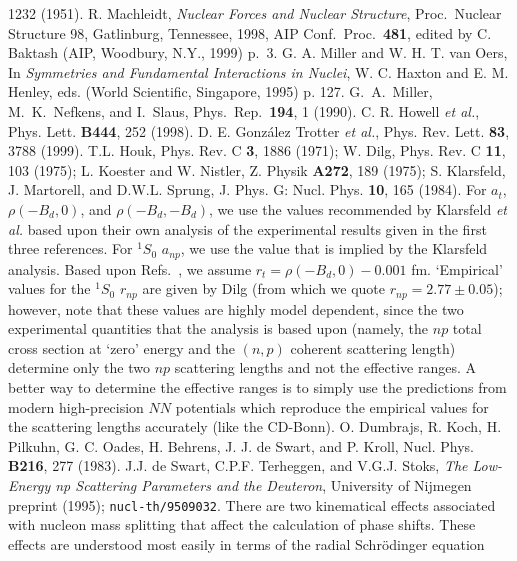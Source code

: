 \begin{references}
1232 (1951).
 R. Machleidt, {\it Nuclear Forces and Nuclear Structure},
Proc.\ Nuclear Structure 98, Gatlinburg, Tennessee, 1998, AIP Conf.\
Proc.\ {\bf 481}, edited by C. Baktash (AIP, Woodbury, N.Y., 1999) p.~3.
\bibitem{MO95} G. A. Miller and W. H. T. van Oers, In {\it Symmetries
and Fundamental Interactions in Nuclei},
W. C. Haxton and E. M. Henley, eds. (World Scientific, Singapore, 1995)
p. 127.
 G.\ A.\ Miller, M.\ K.\ Nefkens, and I.\ Slaus, Phys.\ Rep.\
{\bf 194}, 1 (1990). 
\bibitem{How98} C. R. Howell {\it et al.}, Phys. Lett. {\bf B444}, 252 (1998).
\bibitem{Gon99} D. E. Gonz\'alez Trotter {\it et al.}, 
Phys. Rev. Lett. {\bf 83}, 3788 (1999).
\bibitem{KMS84} T.L. Houk, Phys. Rev. C {\bf 3}, 1886 (1971);
         W. Dilg, Phys. Rev. C {\bf 11}, 103 (1975);
         L. Koester and W. Nistler, Z. Physik {\bf A272}, 189 (1975); 
         S. Klarsfeld, J. Martorell, and D.W.L. Sprung,
         J. Phys. G: Nucl. Phys. {\bf 10}, 165 (1984).
For $a_t$, $\rho(-B_d,0)$, and $\rho(-B_d,-B_d)$,
we use the values recommended by Klarsfeld {\it et al.} based upon
their own analysis of the experimental results given in
the first three references.    
For $^1S_0$ $a_{np}$, we use the value that is implied by
the Klarsfeld analysis. Based upon Refs.~\cite{Dum83,STS95}, we assume
$r_t = \rho(-B_d,0)-0.001$ fm.
`Empirical' values for the $^1S_0$ $r_{np}$ are given by Dilg
(from which we quote $r_{np} = 2.77\pm 0.05$);
however, note that these values are highly model dependent,
since the two experimental quantities that the analysis is based upon
(namely, the $np$ total cross section at `zero' energy and
the $(n,p)$ coherent scattering length) determine only the two $np$
scattering lengths and not the effective ranges.
A better way to determine the effective ranges is to simply
use the predictions from modern high-precision $NN$ potentials
which reproduce the empirical values for the scattering lengths
accurately (like the CD-Bonn).
\bibitem{Dum83} O. Dumbrajs, R. Koch, H. Pilkuhn, G. C. Oades,
H. Behrens, J. J. de Swart, and P. Kroll,
Nucl. Phys. {\bf B216}, 277 (1983).
\bibitem{STS95} J.J. de Swart, C.P.F. Terheggen, and V.G.J. Stoks,
         {\it The Low-Energy np Scattering Parameters and the Deuteron},
         University of Nijmegen preprint (1995); 
         {\tt nucl-th/9509032}. 
\bibitem{foot1} 
There are two kinematical effects associated with nucleon
mass splitting that affect the calculation of phase shifts.
These effects are understood most
easily in terms of the radial Schr\"odinger equation 
\begin{displaymath}

\end{displaymath}
\end{references}
